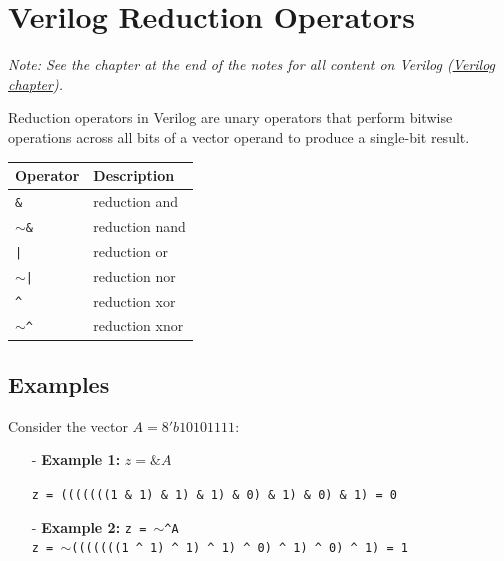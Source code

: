 \documentclass[12pt,openany]{book}
\begin{document}
\section{Verilog Reduction Operators}
 \textit{Note: See the chapter at the end of the notes for all content on Verilog (\hyperref[Verilog]{Verilog chapter}).}


Reduction operators in Verilog are unary operators that perform bitwise operations across all bits of a vector operand to produce a single-bit result.




\begin{center}
	\begin{tabular}{|l|l|}

		\hline	
		Operator & Description \\
		\hline	
		\texttt{\&} & reduction and \\		\hline	
		\texttt{$\sim$\&} & reduction nand \\		\hline	
		\texttt{|} & reduction or \\		\hline	
		\texttt{$\sim$|} & reduction nor \\		\hline	
		\texttt{\^} & reduction xor \\		\hline	
		\texttt{$\sim$\^} & reduction xnor \\		\hline	
		\end{tabular}
	\end{center}
		


\subsection*{Examples}
Consider the vector \( A = 8'b10101111 \):

\begin{itemize}
    \item[-] \textbf{Example 1:} \( z = \&A \)

\texttt{z = (((((((1 \& 1) \& 1) \& 1) \& 0) \& 1) \& 0) \& 1) = 0}
    \item[-] \textbf{Example 2:} \texttt{z = \texttt{$\sim$}\texttt{\^}A} \\

\texttt{z = \texttt{$\sim$}(((((((1 \texttt{\^} 1) \texttt{\^} 1) \texttt{\^} 1) \texttt{\^} 0) \texttt{\^} 1) \texttt{\^} 0) \texttt{\^} 1) = 1  \\}

\end{itemize}
\end{document}
